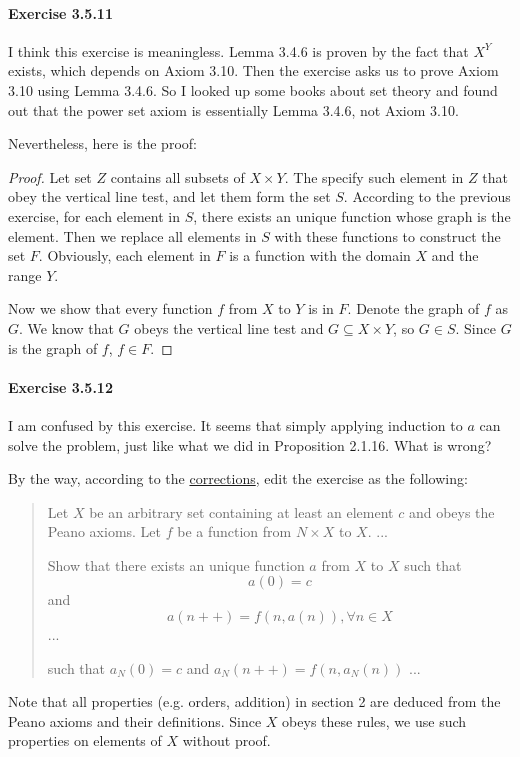 \paragraph{Exercise 3.5.11} \label{exercise3.5.11}
I think this exercise is meaningless. Lemma 3.4.6 is proven by the fact that $X^Y$ exists, which depends 
on Axiom 3.10. Then the exercise asks us to prove Axiom 3.10 using Lemma 3.4.6. So I looked up some books 
about set theory and found out that the power set axiom is essentially Lemma 3.4.6, not Axiom 3.10.

Nevertheless, here is the proof:
\begin{proof}
Let set $Z$ contains all subsets of $X\times Y$. The specify such element in $Z$ that obey the vertical 
line test, and let them form the set $S$. According to the previous exercise, for each element in $S$, 
there exists an unique function whose graph is the element. Then we replace all elements in $S$ with 
these functions to construct the set $F$. Obviously, each element in $F$ is a function with the domain 
$X$ and the range $Y$.

Now we show that every function $f$ from $X$ to $Y$ is in $F$. Denote the graph of $f$ as $G$. We know 
that $G$ obeys the vertical line test and $G \subseteq X \times Y$, so $G \in S$. Since $G$ is the graph 
of $f$, $f \in F$.
\end{proof}

\paragraph{Exercise 3.5.12} \label{exercise3.5.12}
I am confused by this exercise. It seems that simply applying induction to $a$ can solve the 
problem, just like what we did in Proposition 2.1.16. What is wrong?

By the way, according to the \href{https://terrytao.wordpress.com/books/analysis-i/}{corrections}, 
edit the exercise as the following:
\begin{quotation}
Let $X$ be an arbitrary set containing at least an element $c$ and obeys the Peano axioms. Let $f$ be a 
function from $N \times X$ to $X$. ... 

Show that there exists an unique function $a$ from $X$ to $X$ such that 
\[
a(0) = c
\] 
and 
\[
a(n++) = f(n,a(n)), \forall n \in X
\]
...

such that $a_N(0) = c$ and $a_{N}(n++) = f(n,a_N(n))$ ... 
\end{quotation}

Note that all properties (e.g. orders, addition) in section 2 are deduced from the Peano axioms and their 
definitions. Since $X$ obeys these rules, we use such properties on elements of $X$ without proof.

